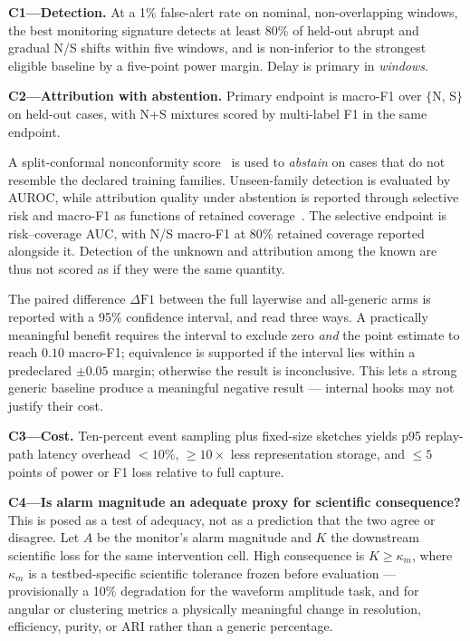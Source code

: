 \documentclass[10pt,twocolumn]{extarticle}
\begin{document}
\textbf{C1---Detection.} At a 1\% false-alert rate on nominal, non-overlapping
windows, the best monitoring signature detects at least 80\% of held-out abrupt
and gradual N/S shifts within five windows, and is non-inferior to the
strongest eligible baseline by a five-point power margin. Delay is primary in
\emph{windows}.

\textbf{C2---Attribution with abstention.} Primary endpoint is macro-F1 over
$\{$N, S$\}$ on held-out cases, with N+S mixtures scored by multi-label F1 in
the same endpoint.

A split-conformal nonconformity score~\cite{angelopoulos2021} is used to
\emph{abstain} on cases that do not resemble the declared training families.
Unseen-family detection is evaluated by AUROC, while attribution quality under
abstention is reported through selective risk and macro-F1 as functions of
retained coverage~\cite{geifman2017}. The selective endpoint is risk--coverage
AUC, with N/S macro-F1 at $80\%$ retained coverage reported alongside it.
Detection of the unknown and attribution among the known are thus not scored as
if they were the same quantity.

The paired difference $\Delta\mathrm{F1}$ between the full layerwise and
all-generic arms is reported with a 95\% confidence interval, and read three
ways. A practically meaningful benefit requires the interval to exclude zero
\emph{and} the point estimate to reach $0.10$ macro-F1; equivalence is supported
if the interval lies within a predeclared $\pm0.05$ margin; otherwise the result
is inconclusive. This lets a strong generic baseline produce a meaningful
negative result --- internal hooks may not justify their cost.

\textbf{C3---Cost.} Ten-percent event sampling plus fixed-size sketches yields
p95 replay-path latency overhead $<10\%$, $\geq10\times$ less representation
storage, and $\leq5$ points of power or F1 loss relative to full capture.

\textbf{C4---Is alarm magnitude an adequate proxy for scientific
consequence?} This is posed as a test of adequacy, not as a prediction that the
two agree or disagree. Let $A$ be the monitor's alarm magnitude and $K$ the
downstream scientific loss for the same intervention cell. High consequence is
$K\geq\kappa_m$, where $\kappa_m$ is a testbed-specific scientific tolerance
frozen before evaluation --- provisionally a 10\% degradation for the waveform
amplitude task, and for angular or clustering metrics a physically meaningful
change in resolution, efficiency, purity, or ARI rather than a generic
percentage.
\end{document}
